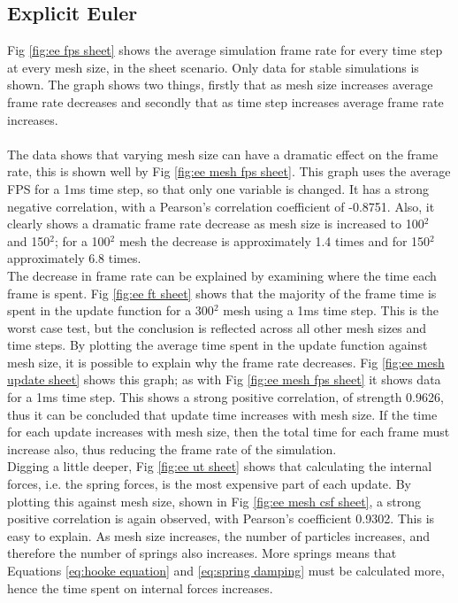 \subsection{Explicit Euler}
Fig \ref{fig:ee fps sheet} shows the average simulation frame rate for every time step at every mesh size, in the sheet scenario. Only data for stable simulations is shown. The graph shows two things, firstly that as mesh size increases average frame rate decreases and secondly that as time step increases average frame rate increases.
\\\\The data shows that varying mesh size can have a dramatic effect on the frame rate, this is shown well by Fig \ref{fig:ee mesh fps sheet}. This graph uses the average FPS for a 1ms time step, so that only one variable is changed. It has a strong negative correlation, with a Pearson's correlation coefficient of -0.8751. Also, it clearly shows a dramatic frame rate decrease as mesh size is increased to 100$^{2}$ and 150$^{2}$; for a 100$^{2}$ mesh the decrease is approximately 1.4 times and for 150$^{2}$ approximately 6.8 times.
\\The decrease in frame rate can be explained by examining where the time each frame is spent. Fig \ref{fig:ee ft sheet} shows that the majority of the frame time is spent in the update function for a 300$^{2}$ mesh using a 1ms time step. This is the worst case test, but the conclusion is reflected across all other mesh sizes and time steps. By plotting the average time spent in the update function against mesh size, it is possible to explain why the frame rate decreases. Fig \ref{fig:ee mesh update sheet} shows this graph; as with Fig \ref{fig:ee mesh fps sheet} it shows data for a 1ms time step. This shows a strong positive correlation, of strength 0.9626, thus it can be concluded that update time increases with mesh size. If the time for each update increases with mesh size, then the total time for each frame must increase also, thus reducing the frame rate of the simulation. 
\\Digging a little deeper, Fig \ref{fig:ee ut sheet} shows that calculating the internal forces, i.e. the spring forces, is the most expensive part of each update. By plotting this against mesh size, shown in Fig \ref{fig:ee mesh csf sheet}, a strong positive correlation is again observed, with Pearson's coefficient 0.9302. This is easy to explain. As mesh size increases, the number of particles increases, and therefore the number of springs also increases. More springs means that Equations \ref{eq:hooke equation} and \ref{eq:spring damping} must be calculated more, hence the time spent on internal forces increases.
